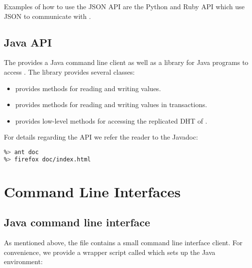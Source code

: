 Examples of how to use the JSON API are the Python and Ruby API which use JSON
to communicate with \scalaris{}.


\subsection{Java API}

The  provides a Java command line client as well as a
library for Java programs to access \scalaris{}. The library provides several
classes:

\begin{itemize}
\item {} provides methods for reading and writing values.
\item {} provides methods for reading and writing values in transactions.
\item {} provides low-level methods for accessing the replicated DHT of \scalaris{}.
\end{itemize}

For details regarding the API we refer the reader to the Javadoc:

\begin{lstlisting}[language=sh]
%> cd java-api
%> ant doc
%> firefox doc/index.html
\end{lstlisting}

\section{Command Line Interfaces}

\subsection{Java command line interface}

As mentioned above, the  file contains a small command line
interface client. For
convenience, we provide a wrapper script called  which
sets up the Java environment:

\begin{lstlisting}[language=sh]
%> ./java-api/scalaris --noconfig --help
\end{lstlisting}


